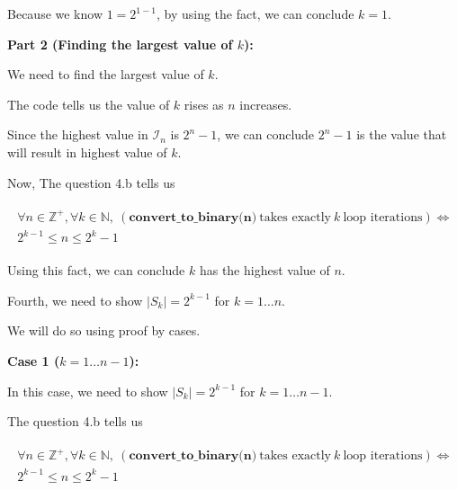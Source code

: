 \documentclass[12pt]{article}
\begin{document}
\begin{enumerate}[a.]
    Because we know $1 = 2^{1 - 1}$, by using the fact, we can conclude $k = 1$.

    \bigskip

    \textbf{Part 2 (Finding the largest value of $k$):}

    \bigskip

    We need to find the largest value of $k$.

    \bigskip

    The code tells us the value of $k$ rises as $n$ increases.

    \bigskip

    Since the highest value in $\mathcal{I}_n$ is $2^n - 1$, we can conclude
    $2^n - 1$ is the value that will result in highest value of $k$.

    \bigskip

    Now, The question 4.b tells us

    \begin{align}
        \begin{split}
        \forall n \in \mathbb{Z}^+, \forall k \in \mathbb{N},\: (\textbf{
        convert\_to\_binary(n)}\:\text{takes exactly}\:k\:\text{loop iterations}) \Leftrightarrow
        \\ 2^{k-1} \leq n \leq 2^k -1
        \end{split}
    \end{align}

    \bigskip

    Using this fact, we can conclude $k$ has the highest value of $n$.

    \bigskip

    Fourth, we need to show $\lvert S_k \rvert = 2^{k-1}$ for $k = 1 \dots n$.

    \bigskip

    We will do so using proof by cases.

    \bigskip

    \textbf{Case 1 ($k = 1 \dots n-1$):}

    \bigskip

    In this case, we need to show $\lvert S_k \rvert = 2^{k-1}$
    for $k = 1 \dots n-1$.

    \bigskip

    The question 4.b tells us

    \begin{align}
        \begin{split}
        \forall n \in \mathbb{Z}^+, \forall k \in \mathbb{N},\: (\textbf{
        convert\_to\_binary(n)}\:\text{takes exactly}\:k\:\text{loop iterations}) \Leftrightarrow
        \\ 2^{k-1} \leq n \leq 2^k -1
        \end{split}
    \end{align}


\end{enumerate}
\end{document}
